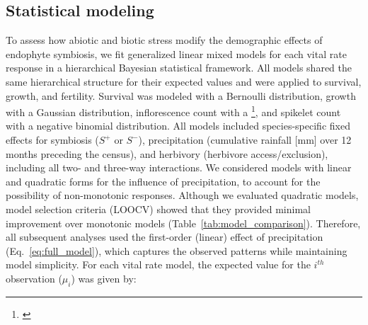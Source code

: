 \documentclass[12pt]{article}\usepackage[]{graphicx}\usepackage[dvipsnames]{xcolor}
\newcommand{\tom}[2]{{\color{red}{#1}}\footnote{\textit{\color{red}{#2}}}}
\begin{document}
\subsection*{Statistical modeling}
To assess how abiotic and biotic stress modify the demographic effects of endophyte symbiosis, we fit generalized linear mixed models for each vital rate response in a hierarchical Bayesian statistical framework. %
All models shared the same hierarchical structure for their expected values and were applied to survival, growth, and fertility.
Survival was modeled with a Bernoulli distribution, growth with a Gaussian distribution, inflorescence count with a \tom{zero-inflated negative binomial distribution}{Was this a hurdle model or a mixture? (I think it should be hurdle. I also wonder if you actually need the zero inflation, or whether the covariates would be sufficient to explain the observed frequency of zeros in a regular NB regression.)}, and spikelet count with a negative binomial distribution.
All models included species-specific fixed effects for symbiosis ($S^+$ or $S^-$), precipitation (cumulative rainfall [mm] over 12 months preceding the census), and herbivory (herbivore access/exclusion), including all two- and three-way interactions. 
We considered models with linear and quadratic forms for the influence of precipitation, to account for the possibility of non-monotonic responses. 
Although we evaluated quadratic models, model selection criteria (LOOCV) showed that they provided minimal improvement over monotonic models (Table~\ref{tab:model_comparison}). 
Therefore, all subsequent analyses used the first-order (linear) effect of precipitation (Eq.~\ref{eq:full_model}), which captures the observed patterns while maintaining model simplicity.
For each vital rate model, the expected value for the $i^{th}$ observation ($\mu_{i}$) was given by:
\end{document}
